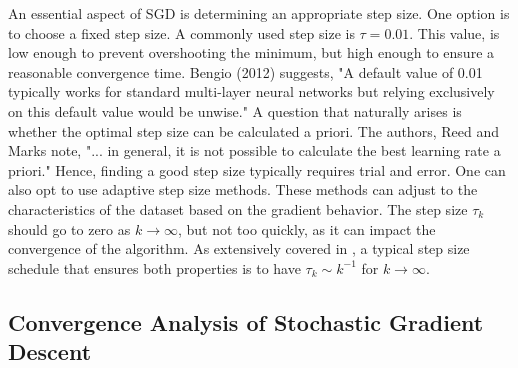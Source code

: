 \begin{comment}
Note that in the case of minimizing large sums, batch gradient descent has complexity $O(np),$ while a step of SGD only has complexity $O(p).$ SGD is thus advantageous when $n$ is very large, and one cannot afford to compute the full gradient.
\end{comment}
An essential aspect of SGD is determining an appropriate step size. One option is to choose a fixed step size. A commonly used step size is $\tau=0.01.$ This value, is low enough to prevent overshooting the minimum, but high enough to ensure a reasonable convergence time. Bengio (2012) suggests, "A default value of 0.01 typically works for standard multi-layer neural networks but relying exclusively on this default value would be unwise."\cite{bengio2012practical} A question that naturally arises is whether the optimal step size can be calculated a priori. The authors, Reed and Marks note, "... in general, it is not possible to calculate the best learning rate a priori."\cite{reed1999neural} Hence, finding a good step size typically requires trial and error. One can also opt to use adaptive step size methods. These methods can adjust to the characteristics of the dataset based on the gradient behavior. The step size $\tau_k$ should go to zero as $k \rightarrow \infty$, but not too quickly, as it can impact the convergence of the algorithm. As extensively covered in \cite[9-11]{murata}, a typical step size schedule that ensures both properties is to have $\tau_k \sim k^{-1}$ for $k \rightarrow \infty$. 

\newpage
\subsection{Convergence Analysis of Stochastic Gradient Descent}
